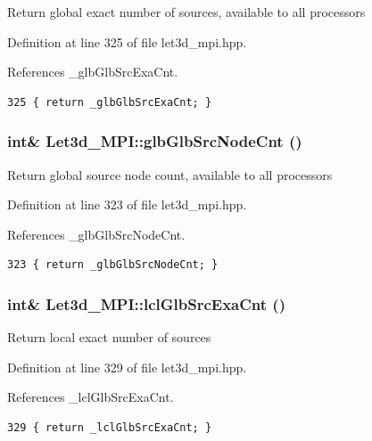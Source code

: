 Return global exact number of sources, available to all processors 

Definition at line 325 of file let3d\_\-mpi.hpp.

References \_\-glb\-Glb\-Src\-Exa\-Cnt.

\footnotesize\begin{verbatim}325 { return _glbGlbSrcExaCnt; }
\end{verbatim}\normalsize 


\subsubsection{\setlength{\rightskip}{0pt plus 5cm}int\& Let3d\_\-MPI::glb\-Glb\-Src\-Node\-Cnt ()\hspace{0.3cm}{\tt  [inline]}}\label{classLet3d__MPI_1cd7d83fe77fb464b606265d4f31c050_1cd7d83fe77fb464b606265d4f31c050}


Return global source node count, available to all processors 

Definition at line 323 of file let3d\_\-mpi.hpp.

References \_\-glb\-Glb\-Src\-Node\-Cnt.

\footnotesize\begin{verbatim}323 { return _glbGlbSrcNodeCnt; }
\end{verbatim}\normalsize 


\subsubsection{\setlength{\rightskip}{0pt plus 5cm}int\& Let3d\_\-MPI::lcl\-Glb\-Src\-Exa\-Cnt ()\hspace{0.3cm}{\tt  [inline]}}\label{classLet3d__MPI_c059775b0357cf1bff1dec7bcfb8bd33_c059775b0357cf1bff1dec7bcfb8bd33}


Return local exact number of sources 

Definition at line 329 of file let3d\_\-mpi.hpp.

References \_\-lcl\-Glb\-Src\-Exa\-Cnt.

\footnotesize\begin{verbatim}329 { return _lclGlbSrcExaCnt; }
\end{verbatim}\normalsize 


